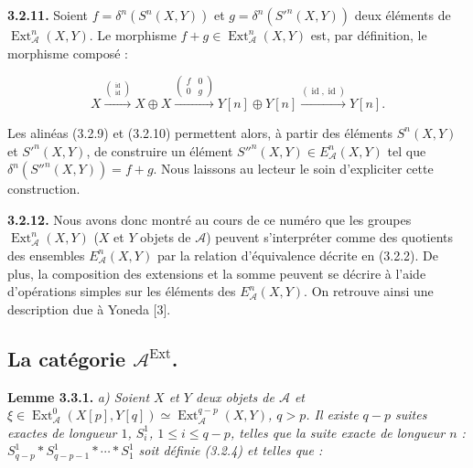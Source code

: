 \clearpage
{}%
\begingroup\small\setlength{\parskip}{0pt}\setlength{\emergencystretch}{1.5em}
\setlength{\abovedisplayskip}{4pt plus 2pt minus 2pt}%
\setlength{\belowdisplayskip}{4pt plus 2pt minus 2pt}%

\medskip\noindent\textbf{3.2.11.}\quad
Soient $f=\delta^n(S^n(X,Y))$ et
$g=\delta^n({S'}^n(X,Y))$ deux éléments de
$\operatorname{Ext}_{\mathcal A}^{n}(X,Y)$. Le morphisme
$f+g\in\operatorname{Ext}_{\mathcal A}^{n}(X,Y)$ est, par définition, le
morphisme composé :

\[
X\xrightarrow{\binom{\operatorname{id}}{\operatorname{id}}}X\oplus X
\xrightarrow{\begin{pmatrix}f&0\\0&g\end{pmatrix}}
Y[n]\oplus Y[n]
\xrightarrow{(\operatorname{id},\operatorname{id})}Y[n].
\]

Les alinéas (3.2.9) et (3.2.10) permettent alors, à partir des éléments
$S^n(X,Y)$ et ${S'}^n(X,Y)$, de construire un élément
${S''}^n(X,Y)\in E_{\mathcal A}^{n}(X,Y)$ tel que
$\delta^n({S''}^n(X,Y))=f+g$. Nous laissons au lecteur le soin d'expliciter
cette construction.

\medskip\noindent\textbf{3.2.12.}\quad
Nous avons donc montré au cours de ce numéro que les groupes
$\operatorname{Ext}_{\mathcal A}^{n}(X,Y)$ ($X$ et $Y$ objets de
$\mathcal A$) peuvent s'interpréter comme des quotients des ensembles
$E_{\mathcal A}^{n}(X,Y)$ par la relation d'équivalence décrite en (3.2.2).
De plus, la composition des extensions et la somme peuvent se décrire à
l'aide d'opérations simples sur les éléments des $E_{\mathcal A}^{n}(X,Y)$.
On retrouve ainsi une description due à Yoneda [3].

\subsection{La catégorie
\texorpdfstring{$\mathcal A^{\operatorname{Ext}}$}{A Ext}.}

\medskip\noindent\textbf{Lemme 3.3.1.}\quad
\textit{a) Soient $X$ et $Y$ deux objets de $\mathcal A$ et
$\xi\in\operatorname{Ext}_{\mathcal A}^{0}(X[p],Y[q])\simeq
\operatorname{Ext}_{\mathcal A}^{q-p}(X,Y)$, $q>p$. Il existe $q-p$ suites
exactes de longueur $1$, $S_i^1$, $1\leq i\leq q-p$, telles que la suite
exacte de longueur $n$ :
$S_{q-p}^1*S_{q-p-1}^1*\cdots*S_1^1$ soit définie (3.2.4) et telles que :}

